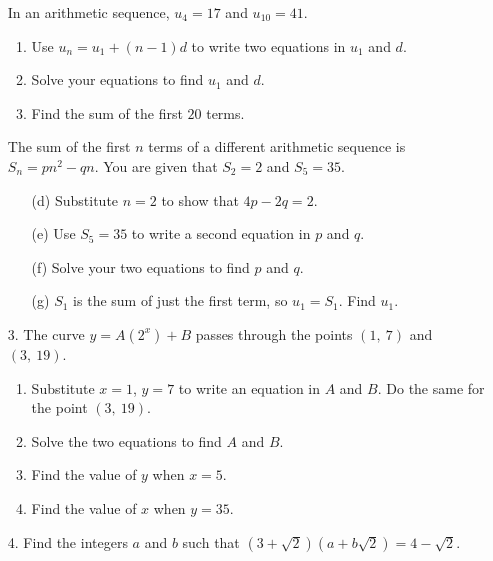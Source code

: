 \documentclass[12pt, twoside]{article}
\begin{document}
\begin{enumerate}[itemsep=0.15cm]
\medskip
In an arithmetic sequence, $u_{4} = 17$ and $u_{10} = 41$.

\begin{enumerate}[itemsep=0.15cm]
  \item Use $u_{n} = u_{1} + (n - 1)d$ to write two equations in $u_{1}$
  and $d$. \vfill
  \item Solve your equations to find $u_{1}$ and $d$. \vfill
  \item Find the sum of the first $20$ terms. \vfill
\end{enumerate}

The sum of the first $n$ terms of a different arithmetic sequence is
$S_{n} = pn^{2} - qn$. You are given that $S_{2} = 2$ and $S_{5} = 35$.

\begin{enumerate}[itemsep=0.15cm]
  \item[(d)] Substitute $n = 2$ to show that $4p - 2q = 2$. \vfill
  \item[(e)] Use $S_{5} = 35$ to write a second equation in $p$ and $q$.
  \vfill
  \item[(f)] Solve your two equations to find $p$ and $q$. \vfill
  \item[(g)] $S_{1}$ is the sum of just the first term, so
  $u_{1} = S_{1}$. Find $u_{1}$. \vfill
\end{enumerate}

\newpage

\item[3.]
The curve $y = A\left(2^{x}\right) + B$ passes through the points
$(1,\ 7)$ and $(3,\ 19)$.

\begin{enumerate}[itemsep=0.15cm]
  \item Substitute $x = 1$, $y = 7$ to write an equation in $A$ and $B$.
  Do the same for the point $(3,\ 19)$. \vfill
  \item Solve the two equations to find $A$ and $B$. \vfill
  \item Find the value of $y$ when $x = 5$. \vfill
  \item Find the value of $x$ when $y = 35$. \vfill
\end{enumerate}

\item[4.]
Find the integers $a$ and $b$ such that
$\left(3 + \sqrt{2}\right)\left(a + b\sqrt{2}\right) = 4 - \sqrt{2}$.


\end{enumerate}
\end{document}
